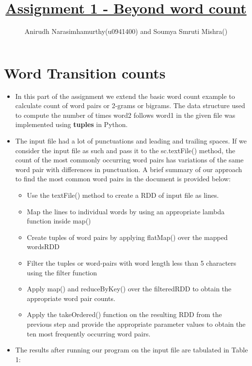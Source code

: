 \documentclass[11pt]{article}
\title{\textbf{\underline{Assignment 1 - Beyond word count}}}
\author{Anirudh Narasimhamurthy(u0941400) and Soumya Smruti Mishra()}
\begin{document}
\maketitle

\section{Word Transition counts}

\begin{itemize}

\item[] In this part of the assignment we extend the basic word count example to calculate count of word pairs or 2-grams or bigrams. The data structure used to compute the number of times word2 follows word1 in the given file was implemented using \textbf{tuples} in Python.

\item[] The input file had a lot of punctuations and leading and trailing spaces. If we consider the input file as such and pass it to the sc.textFile() method, the count of the most commonly occurring word pairs has variations of the same word pair with differences in punctuation.  A brief summary of our approach to find the most common word pairs in the document is provided below:

\begin{itemize}
\item Use the textFile() method to create a RDD of input file as lines.
\item Map the lines to individual words by using an appropriate lambda function inside map()
\item Create tuples of word pairs by applying flatMap() over the mapped wordsRDD
\item Filter the tuples or word-pairs with word length less than 5 characters using the filter function
\item Apply map() and reduceByKey() over the filteredRDD to obtain the appropriate word pair counts.
\item Apply the takeOrdered() function on the resulting RDD from the previous step and provide the appropriate parameter values to obtain the ten most frequently occurring word pairs.


\end{itemize}

\item[]  The results after running our program on the input file are tabulated in Table 1:



\end{itemize}
\end{document}
